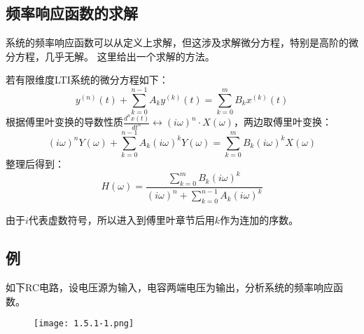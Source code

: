 \subsection{频率响应函数的求解}

\begin{tcolorbox}
系统的频率响应函数可以从定义上求解，但这涉及求解微分方程，特别是高阶的微分方程，几乎无解。
这里给出一个求解的方法。
\end{tcolorbox}

若有限维度LTI系统的微分方程如下：
\[
y^{\left( n \right)}\left( t \right) +\sum_{k=0}^{n-1}{A_ky^{\left( k \right)}\left( t \right)}=\sum_{k=0}^m{B_kx^{\left( k \right)}\left( t \right)}
\]
根据傅里叶变换的导数性质$\frac{d^nx\left( t \right)}{dt^n}\leftrightarrow \left( i\omega \right) ^n\cdot X\left( \omega \right) $，两边取傅里叶变换：
\[
\left( i\omega \right) ^nY\left( \omega \right) +\sum_{k=0}^{n-1}{A_k\left( i\omega \right) ^kY\left( \omega \right)}=\sum_{k=0}^m{B_k\left( i\omega \right) ^kX\left( \omega \right)}
\]
整理后得到：
\[
H\left( \omega \right) =\frac{\sum_{k=0}^m{B_k\left( i\omega \right) ^k}}{\left( i\omega \right) ^n+\sum_{k=0}^{n-1}{A_k\left( i\omega \right) ^k}}
\]

\begin{tcolorbox}
由于$i$代表虚数符号，所以进入到傅里叶章节后用$k$作为连加的序数。
\end{tcolorbox}

\subsection{例}

\begin{example}
如下RC电路，设电压源为输入，电容两端电压为输出，分析系统的频率响应函数。
\begin{figure}[h]
\centering
\texttt{[image: 1.5.1-1.png]}
\end{figure}
\end{example}

